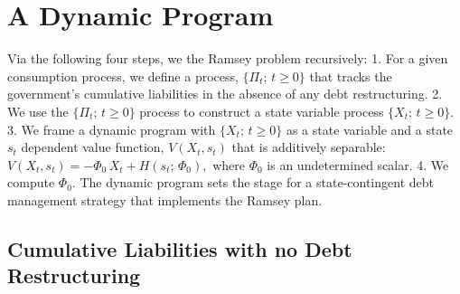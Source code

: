 \documentclass[12pt]{article}
\newcommand{\NW}[1]{{\textcolor{blue}{#1}}}
\begin{document}
	

\section{A Dynamic Program}\label{sec:bellmanramsey} %



{Via the following four steps, we  the Ramsey problem recursively: %
1. For a given consumption process, we define  a process, $\{\Pi_t;\, t \ge 0\}$ that tracks the government's cumulative liabilities in the absence of any debt restructuring. 2. We use the  $\{\Pi_t;\, t \ge 0\}$ process to construct a state variable process $\{X_t;\, t \ge 0\}$. 3. We frame  a dynamic program with $\{X_t;\, t \ge 0\}$ as a state variable and a  state $s_t$ dependent value function, $V(X_t,s_t)$ that  is additively separable: $V(X_t,s_t) = -\Phi_0\, X_t + H(s_t;\, \Phi_0),$ where  $\Phi_0$ is an undetermined  scalar.  4. We compute $\Phi_0$. 
} %
The  dynamic program  sets the stage for   a  state-contingent debt management strategy that  implements the Ramsey plan. 
 
 
 
\subsection{{Cumulative Liabilities with no Debt Restructuring}}
\end{document}
